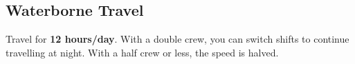 \documentclass[itdr]{subfiles}
\begin{document}

\vspace{-1ex}

\begin{comment}
\subparagraph{Horizon} is 3 miles away on a flat surface (for an Earth-sized planet), 12 miles at 100~ft height (ship's mast, tower), etc.: $dist.~(miles) \approx \sqrt{1.5 \times height~(ft)}$.

\vfill
\dimage{waterborne}{75pt}
\end{comment}

\begin{comment}
\subparagraph{Horizon} is 3 miles away for a 6~ft tall observer (on an Earth-sized planet), 12 miles at 100~ft height (ship's mast, tower), etc.:

\vspace{1ex}
\begin{vwcol}[widths={0.275, 0.725}, rule=0pt]

\vspace{-14pt}\noindent\hspace{0.25em}
$d \approx \sqrt{1.5 \times h}$

\vspace{6pt}\noindent
$$x \approx \frac{(d-o)^2}{1.5}$$

\columnbreak

$d$ --- horizon distance, miles

$h$ --- observer height, feet

$x$ --- object height obscured, feet

$o$ --- object distance, miles

\end{vwcol}

\vfill
\end{comment}


\subsection{Waterborne Travel}

Travel for \textbf{12 hours/day}. With a double crew, you can switch shifts to continue travelling at night. With a half crew or less, the speed is halved.
\end{document}
